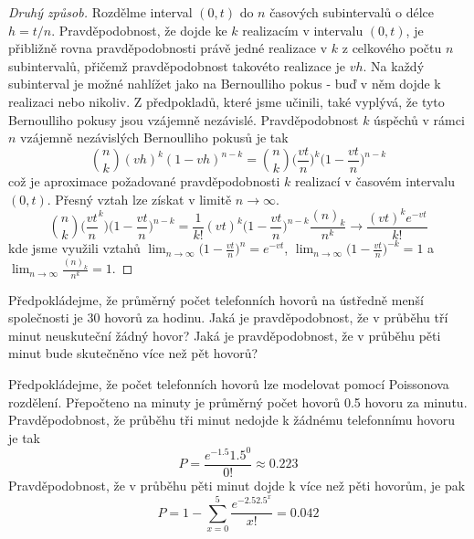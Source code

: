 \begin{proof}[Druhý způsob]
Rozdělme interval $(0, t)$ do $n$ časových subintervalů o délce $h = t/n$. Pravděpodobnost, že dojde ke $k$ realizacím v intervalu $(0, t)$, je přibližně rovna pravděpodobnosti právě jedné realizace v $k$ z celkového počtu $n$ subintervalů, přičemž pravděpodobnost takovéto realizace je $vh$. Na každý subinterval je možné nahlížet jako na Bernoulliho pokus - buď v něm dojde k realizaci nebo nikoliv. Z předpokladů, které jsme učinili, také vyplývá, že tyto Bernoulliho pokusy jsou vzájemně nezávislé. Pravděpodobnost $k$ úspěchů v rámci $n$ vzájemně nezávislých Bernoulliho pokusů je tak
\begin{equation*}
\binom{n}{k}(vh)^k (1 - vh)^{n-k} = \binom{n}{k}\Big(\frac{vt}{n}\Big)^k\Big(1 - \frac{vt}{n} \Big)^{n-k}
\end{equation*}
což je aproximace požadované pravděpodobnosti $k$ realizací v časovém intervalu $(0, t)$. Přesný vztah lze získat v limitě $n \rightarrow \infty$.
\begin{equation*}
\binom{n}{k}\Big(\frac{vt}{n}^k\Big)\Big(1 - \frac{vt}{n} \Big)^{n-k} = \frac{1}{k!}(vt)^k\Big(1 - \frac{vt}{n} \Big)^{n-k}\frac{(n)_k}{n^k} \rightarrow \frac{(vt)^k e^{-vt}}{k!}
\end{equation*}
kde jsme využili vztahů $\lim_{n \rightarrow \infty} \Big(1 - \frac{vt}{n} \Big)^n = e^{-vt}$, $\lim_{n \rightarrow \infty} \Big(1 - \frac{vt}{n} \Big)^{-k} = 1$ a $\lim_{n \rightarrow \infty} \frac{(n)_k}{n^k} = 1$.
\end{proof}

\begin{example}
Předpokládejme, že průměrný počet telefonních hovorů na ústředně menší společnosti je 30 hovorů za hodinu. Jaká je pravděpodobnost, že v průběhu tří minut neuskuteční žádný hovor? Jaká je pravděpodobnost, že v průběhu pěti minut bude skutečněno více než pět hovorů?

Předpokládejme, že počet telefonních hovorů lze modelovat pomocí Poissonova rozdělení. Přepočteno na minuty je průměrný počet hovorů 0.5 hovoru za minutu. Pravděpodobnost, že průběhu tři minut nedojde k žádnému telefonnímu hovoru je tak
\begin{equation*}
P = \frac{e^{-1.5}1.5^0}{0!} \approx 0.223
\end{equation*}
Pravděpodobnost, že v průběhu pěti minut dojde k více než pěti hovorům, je pak
\begin{equation*}
P = 1 - \sum_{x=0}^5 \frac{e^{-2.5 2.5^x}}{x!} = 0.042
\end{equation*}
\end{example}

